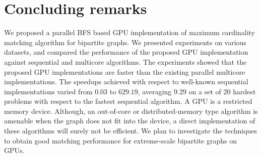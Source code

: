\documentclass[11pt,a4paper]{article}
\begin{document}
\begin{table}[!htb]
{\begin{tabular}{l|r|r|r|r||r|r|r|r}
\end{tabular}
}
\end{table}


\section{Concluding remarks}\label{sec:con}

We proposed a parallel BFS based GPU implementation of maximum cardinality 
matching algorithm for bipartite graphs. We presented experiments on various 
datasets, and compared the performance of the proposed GPU implementation against sequential and multicore algorithms. The 
experiments showed that the proposed GPU implementations are faster than the 
existing parallel multicore implementations. 
The speedups achieved with respect to well-known sequential implementations varied from $0.03$ to $629.19$, averaging $9.29$ on a set of 20 hardest problems with respect to the fastest sequential algorithm.
A GPU is a restricted memory device. 
Although, an out-of-core or distributed-memory type algorithm is amenable when the graph does not fit into the 
device, a direct implementation of these algorithms will surely not be efficient. 
We plan to investigate the techniques to obtain good matching performance for extreme-scale bipartite graphs on GPUs. 
\end{document}
